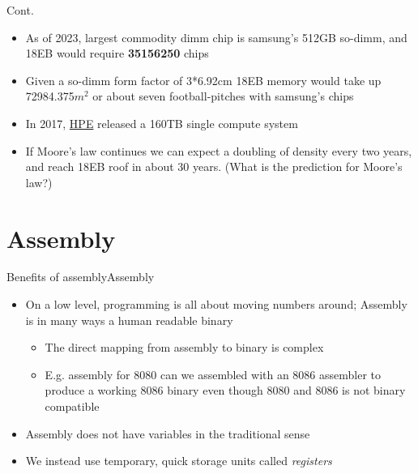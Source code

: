 \documentclass[
	11pt, %
	aspectratio=169, %
]{beamer}
\begin{document}
\begin{frame}{Cont.}{\sectiontitle}
    \begin{itemize}
        \item As of 2023, largest commodity dimm chip is samsung's 512GB so-dimm, and 18EB would require \textbf{35156250} chips
        \item Given a so-dimm form factor of 3*6.92cm 18EB memory would take up 72984.375$m^2$ or about seven football-pitches with samsung's chips
        \item In 2017, \href{https://www.hpe.com/us/en/newsroom/press-release/2017/05/a-new-computer-built-for-the-big-data-era.html}{HPE} released a 160TB single compute system
        \item If Moore's law continues we can expect a doubling of density every two years, and reach 18EB roof in about 30 years. (What is the prediction for Moore's law?)
    \end{itemize}
\end{frame}


\section{Assembly}
\def \sectiontitle{Assembly}
\begin{frame}{Benefits of assembly}{\sectiontitle}

    \begin{itemize}
        \item On a low level, programming is all about moving numbers around; Assembly is in many ways a human readable binary
              \begin{itemize}
                  \item The direct mapping from assembly to binary is complex
                  \item E.g. assembly for 8080 can we assembled with an 8086 assembler to produce a working 8086 binary even though 8080 and 8086 is not binary compatible
              \end{itemize}
        \item Assembly does not have variables in the traditional sense
        \item We instead use temporary, quick storage units called \textit{registers}
    \end{itemize}
\end{frame}
\end{document}
